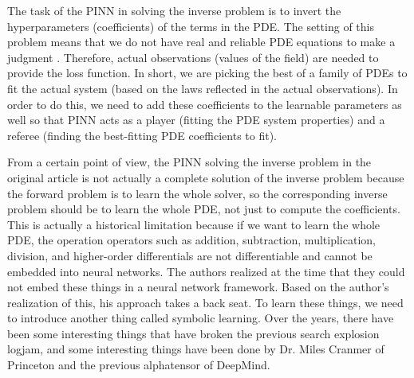 \documentclass[12pt]{article}
\begin{document}
The task of the PINN in solving the inverse problem is to invert the hyperparameters (coefficients) of the terms in the PDE. The setting of this problem means that we do not have real and reliable PDE equations to make a judgment . Therefore, actual observations (values of the field) are needed to provide the loss function. In short, we are picking the best of a family of PDEs to fit the actual system (based on the laws reflected in the actual observations). In order to do this, we need to add these coefficients to the learnable parameters as well so that PINN acts as a player (fitting the PDE system properties) and a referee (finding the best-fitting PDE coefficients to fit).

From a certain point of view, the PINN solving the inverse problem in the original article is not actually a complete solution of the inverse problem because the forward problem is to learn the whole solver, so the corresponding inverse problem should be to learn the whole PDE, not just to compute the coefficients. This is actually a historical limitation because if we want to learn the whole PDE, the operation operators such as addition, subtraction, multiplication, division, and higher-order differentials are not differentiable and cannot be embedded into neural networks. The authors realized at the time that they could not embed these things in a neural network framework. Based on the author's realization of this, his approach takes a back seat. To learn these things, we need to introduce another thing called symbolic learning. Over the years, there have been some interesting things that have broken the previous search explosion logjam, and some interesting things have been done by Dr. Miles Cranmer of Princeton and the previous alphatensor of DeepMind. 
\end{document}
